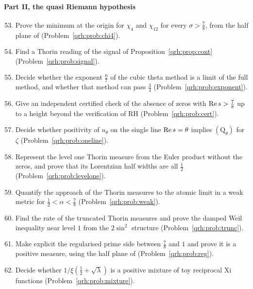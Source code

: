 \paragraph{Part II, the quasi Riemann hypothesis}
\begin{enumerate}
\setcounter{enumi}{52}
\item Prove the minimum at the origin for $\chi_4$ and $\chi_{12}$ for every $\sigma>\frac78$, from the half plane of \cite{OAI26a} (Problem~\ref{qrh:prob:chi4}).
\item Find a Thorin reading of the signal of Proposition~\ref{qrh:prop:cont} (Problem~\ref{qrh:prob:signal}).
\item Decide whether the exponent $\frac67$ of the cubic theta method is a limit of the full method, and whether that method can pass $\frac34$ (Problem~\ref{qrh:prob:exponent}).
\item Give an independent certified check of the absence of zeros with $\operatorname{Re} s>\frac78$ up to a height beyond the verification of RH (Problem~\ref{qrh:prob:cert}).
\item Decide whether positivity of $u_\theta$ on the single line $\operatorname{Re} s=\theta$ implies $(\mathrm Q_\theta)$ for $\zeta$ (Problem~\ref{qrh:prob:oneline}).
\item Represent the level one Thorin measure from the Euler product without the zeros, and prove that its Lorentzian half widths are all $\frac12$ (Problem~\ref{qrh:prob:levelone}).
\item Quantify the approach of the Thorin measures to the atomic limit in a weak metric for $\frac12<\alpha<\frac78$ (Problem~\ref{qrh:prob:weak}).
\item Find the rate of the truncated Thorin measures and prove the damped Weil inequality near level $1$ from the $2\sin^2$ structure (Problem~\ref{qrh:prob:trunc}).
\item Make explicit the regularised prime side between $\frac78$ and $1$ and prove it is a positive measure, using the half plane of \cite{OAI26a} (Problem~\ref{qrh:prob:reg}).
\item Decide whether $1/\xi(\frac12+\sqrt\lambda)$ is a positive mixture of toy reciprocal Xi functions (Problem~\ref{qrh:prob:mixture}).
\end{enumerate}

